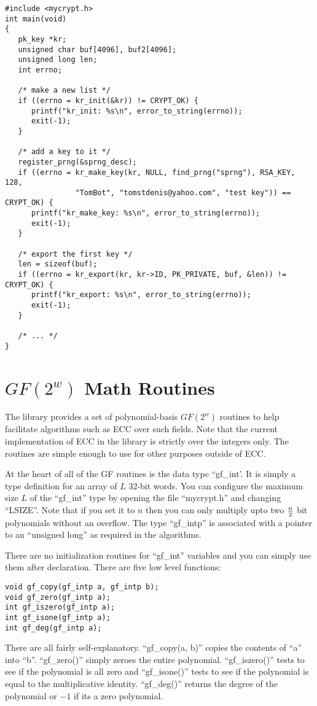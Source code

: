 \documentclass{book}
\begin{document}
\begin{small}
\begin{verbatim}
#include <mycrypt.h>
int main(void)
{
   pk_key *kr;
   unsigned char buf[4096], buf2[4096];
   unsigned long len;
   int errno;

   /* make a new list */
   if ((errno = kr_init(&kr)) != CRYPT_OK) {
      printf("kr_init: %s\n", error_to_string(errno));
      exit(-1);
   }

   /* add a key to it */
   register_prng(&sprng_desc);
   if ((errno = kr_make_key(kr, NULL, find_prng("sprng"), RSA_KEY, 128, 
                "TomBot", "tomstdenis@yahoo.com", "test key")) == CRYPT_OK) {
      printf("kr_make_key: %s\n", error_to_string(errno));
      exit(-1);
   }

   /* export the first key */
   len = sizeof(buf);
   if ((errno = kr_export(kr, kr->ID, PK_PRIVATE, buf, &len)) != CRYPT_OK) {
      printf("kr_export: %s\n", error_to_string(errno));
      exit(-1);
   }

   /* ... */
}  
\end{verbatim}
\end{small}

\chapter{$GF(2^w)$ Math Routines}

The library provides a set of polynomial-basis $GF(2^w)$ routines to help facilitate algorithms such as ECC over such
fields.  Note that the current implementation of ECC in the library is strictly over the integers only.  The routines
are simple enough to use for other purposes outside of ECC.  

At the heart of all of the GF routines is the data type ``gf\_int'.  It is simply a type definition for an array of 
$L$ 32-bit words.  You can configure the maximum size $L$ of the ``gf\_int'' type by opening the file ``mycrypt.h'' and 
changing ``LSIZE''.  Note that if you set it to $n$ then you can only multiply upto two $n \over 2$ bit polynomials without
an overflow.  The type ``gf\_intp'' is associated with a pointer to an ``unsigned long'' as required in the algorithms.

There are no initialization routines for ``gf\_int'' variables and you can simply use them after declaration.  There are five
low level functions:
    
\begin{verbatim}
void gf_copy(gf_intp a, gf_intp b);
void gf_zero(gf_intp a);
int gf_iszero(gf_intp a);
int gf_isone(gf_intp a);
int gf_deg(gf_intp a);
\end{verbatim}
There are all fairly self-explanatory.  ``gf\_copy(a, b)'' copies the contents of ``a'' into ``b''.  ``gf\_zero()'' simply
zeroes the entire polynomial.  ``gf\_iszero()'' tests to see if the polynomial is all zero and ``gf\_isone()'' tests to see
if the polynomial is equal to the multiplicative identity.  ``gf\_deg()'' returns the degree of the polynomial or $-1$ if its
a zero polynomial.
\end{document}
